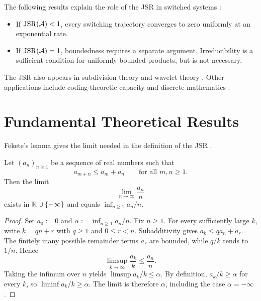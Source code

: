 The following results explain the role of the JSR in switched systems \citep{Jungers2009JointSpectralRadius}:
\begin{itemize}
    \item If $\operatorname{JSR}(\mathcal{A})<1$, every switching trajectory converges to zero uniformly at an exponential rate.
    \item If $\operatorname{JSR}(\mathcal{A})=1$, boundedness requires a separate argument.
    Irreducibility is a sufficient condition for uniformly bounded products, but is not necessary.
\end{itemize}
The JSR also appears in subdivision theory \citep{CavarettaDahmenMicchelli1991StationarySubdivision} and wavelet theory \citep{DaubechiesLagarias1992TwoScaleII,Maesumi2000JSRHolderWavelets}.
Other applications include coding-theoretic capacity \citep{MoisionOrlitskySiegel2001CodesAvoidDifferences,BlondelJungersProtasov2006CapacityCodes} and discrete mathematics \citep{Protasov2000PartitionFunctionAsymptotic,JungersProtasovBlondel2008IntegerMatrixGrowth,JungersProtasovBlondel2009OverlapFreeWordsSpectra}.

\section{Fundamental Theoretical Results}
\label{sec:introTheoreticalBackground}

Fekete's lemma gives the limit needed in the definition of the JSR \citep{Jungers2009JointSpectralRadius}.

\begin{lemma}\label{lem:feketeLemma}
    Let $(a_n)_{n\geq 1}$ be a sequence of real numbers such that
    \begin{equation}\label{eq:subadditive}
        a_{m+n} \leq a_m + a_n \qquad \text{for all } m,n\geq 1.
    \end{equation}
    Then the limit
    \[
        \lim_{n\to\infty}\frac{a_n}{n}
    \]
    exists in $\mathbb{R}\cup\{-\infty\}$ and equals $\inf_{n\geq 1}a_n/n$.
\end{lemma}

\begin{proof}
    Set $a_0:=0$ and $\alpha:=\inf_{n\geq1}a_n/n$.
    Fix $n\geq1$.
    For every sufficiently large $k$, write $k=qn+r$ with $q\geq1$ and $0\leq r<n$.
    Subadditivity gives $a_k\leq q a_n+a_r$.
    The finitely many possible remainder terms $a_r$ are bounded, while $q/k$ tends to $1/n$.
    Hence
    \[
        \limsup_{k\to\infty}\frac{a_k}{k}\leq\frac{a_n}{n}.
    \]
    Taking the infimum over $n$ yields $\limsup a_k/k\leq\alpha$.
    By definition, $a_k/k\geq\alpha$ for every $k$, so $\liminf a_k/k\geq\alpha$.
    The limit is therefore $\alpha$, including the case $\alpha=-\infty$.
\end{proof}

